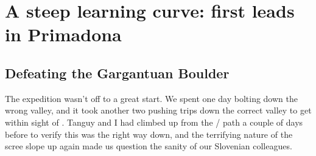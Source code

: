 \section{A steep learning curve: first leads in Primadona}

\subsection{Defeating the Gargantuan Boulder}
The expedition wasn’t off to a great start. We spent one day bolting down the wrong valley, and it took another two pushing trips down the correct valley to get within sight of . Tanguy and I had climbed up from the / path a couple of days before to verify this was the right way down, and the terrifying nature of the scree slope up again made us question the sanity of our Slovenian colleagues.

